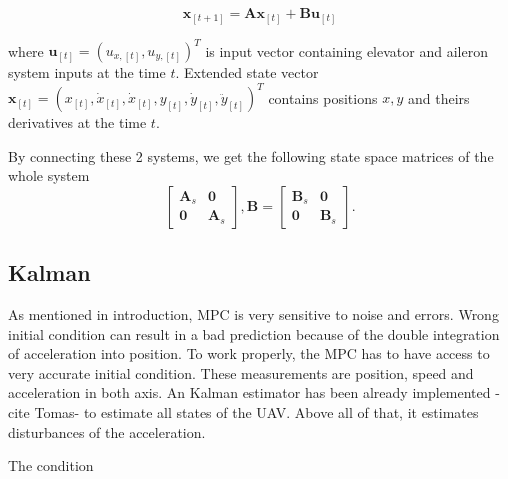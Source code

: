 \documentclass{article}
\begin{document}
\begin{equation}
\label{eq:state_space_model_simple}
\textbf{x}_{[t+1]} = \textbf{A} \textbf{x}_{[t]} +\textbf{B} \textbf{u}_{[t]}
\end{equation}

where $\textbf{u}_{[t]} = (u_{x,[t]}, u_{y,[t]})^T$ is input vector containing elevator and aileron system inputs at the time $t$. Extended state vector $\textbf{x}_{[t]} = (x_{[t]}, \dot{x}_{[t]}, \dot{x}_{[t]}, y_{[t]}, \dot{y}_{[t]}, \ddot{y}_{[t]})^T$ contains positions $x,y$ and theirs derivatives at the time $t$. 

By connecting these 2 systems, we get the following state space matrices of the whole system
\begin{equation}
\label{eq:state_space}
\begin{bmatrix}
	\textbf{A}_s & \textbf{0}	\\
	\textbf{0}   & \textbf{A}_s
\end{bmatrix}, \textbf{B} = \begin{bmatrix}
	\textbf{B}_s & \textbf{0}	\\
	\textbf{0}   & \textbf{B}_s
\end{bmatrix}.
\end{equation}


\subsection{Kalman}
As mentioned in introduction, MPC is very sensitive to noise and errors. Wrong initial condition can result in a bad prediction because of the double integration of acceleration into position. To work properly, the MPC has to have access to very accurate initial condition. These measurements are position, speed and acceleration in both axis. An Kalman estimator has been already implemented -cite Tomas- to estimate all states of the UAV. Above all of that, it estimates disturbances of the acceleration.







The condition 

\subsubsection{}
\end{document}
